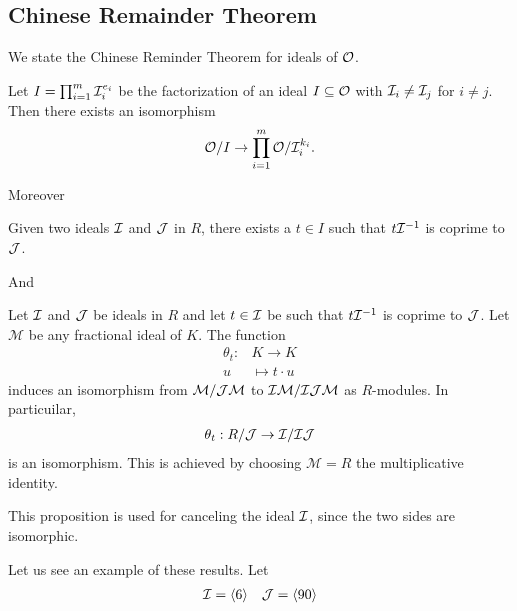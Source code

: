 \subsection{Chinese Remainder Theorem}
    We state the Chinese Reminder Theorem for ideals of \(\mathcal{O}\).
    \begin{theorem}
    \label{Thm: CRT}
        Let \(I = \prod_{i = 1}^m \mathcal{I}_i^{e_i}\) be the factorization of an ideal \(I\subseteq \mathcal{O}\) with \(\mathcal{I}_i \not= \mathcal{I}_j\) for \(i\not = j\). Then there exists an isomorphism
        \begin{align*}
            \mathcal{O}/I \rightarrow \prod\limits_{i = 1}^m \mathcal{O}/\mathcal{I}_i^{k_i}.
        \end{align*}
    \end{theorem}
    Moreover
    \begin{proposition}
        Given two ideals \(\mathcal{I}\) and \(\mathcal{J}\) in \(R\), there exists a \(t\in I\) such that \(t\mathcal{I}^{-1}\) is coprime to \(\mathcal{J}\).
    \end{proposition}
    And
    \begin{proposition}
    \label{Prop: Cancel Ideal}
        Let \(\mathcal{I}\) and \(\mathcal{J}\) be ideals in \(R\) and let \(t\in\mathcal{I}\) be such that \(t\mathcal{I}^{-1}\) is coprime to \(\mathcal{J}\). Let \(\mathcal{M}\) be any fractional ideal of \(K\). The function
        \begin{equation*}
            \begin{split}
                \theta_t:&K\rightarrow K\\
                u & \mapsto t\cdot u
            \end{split}
        \end{equation*}
        induces an isomorphism from \(\mathcal{M}/\mathcal{J}\mathcal{M}\) to \(\mathcal{I}\mathcal{M}/\mathcal{I}\mathcal{J}\mathcal{M}\) as \(R\)-modules. In particuilar,
        \begin{align*}
            \theta_t : R/\mathcal{J}\rightarrow \mathcal{I}/\mathcal{I}\mathcal{J}
        \end{align*}
        is an isomorphism. This is achieved by choosing \(\mathcal{M} = R\) the multiplicative identity.
    \end{proposition}
    This proposition is used for canceling the ideal \(\mathcal{I}\), since the two sides are isomorphic.\par
    Let us see an example of these results. Let
    \begin{align*}
        \mathcal{I} = \langle 6 \rangle \quad \mathcal{J} = \langle 90 \rangle
    \end{align*}
